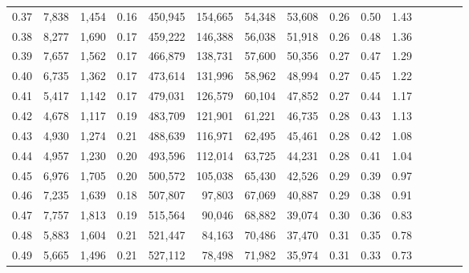 \begin{tabular}{rrrcrrrrrrrrrrr}
0.37 &   7,838 &  1,454 &                                       0.16 &  450,945 &  154,665 &   54,348 &   53,608 &  0.26 &  0.50 &                         1.43 \\
0.38 &   8,277 &  1,690 &                                       0.17 &  459,222 &  146,388 &   56,038 &   51,918 &  0.26 &  0.48 &                         1.36 \\
0.39 &   7,657 &  1,562 &                                       0.17 &  466,879 &  138,731 &   57,600 &   50,356 &  0.27 &  0.47 &                         1.29 \\
0.40 &   6,735 &  1,362 &                                       0.17 &  473,614 &  131,996 &   58,962 &   48,994 &  0.27 &  0.45 &                         1.22 \\
0.41 &   5,417 &  1,142 &                                       0.17 &  479,031 &  126,579 &   60,104 &   47,852 &  0.27 &  0.44 &                         1.17 \\
0.42 &   4,678 &  1,117 &                                       0.19 &  483,709 &  121,901 &   61,221 &   46,735 &  0.28 &  0.43 &                         1.13 \\
0.43 &   4,930 &  1,274 &                                       0.21 &  488,639 &  116,971 &   62,495 &   45,461 &  0.28 &  0.42 &                         1.08 \\
0.44 &   4,957 &  1,230 &                                       0.20 &  493,596 &  112,014 &   63,725 &   44,231 &  0.28 &  0.41 &                         1.04 \\
0.45 &   6,976 &  1,705 &                                       0.20 &  500,572 &  105,038 &   65,430 &   42,526 &  0.29 &  0.39 &                         0.97 \\
0.46 &   7,235 &  1,639 &                                       0.18 &  507,807 &   97,803 &   67,069 &   40,887 &  0.29 &  0.38 &                         0.91 \\
0.47 &   7,757 &  1,813 &                                       0.19 &  515,564 &   90,046 &   68,882 &   39,074 &  0.30 &  0.36 &                         0.83 \\
0.48 &   5,883 &  1,604 &                                       0.21 &  521,447 &   84,163 &   70,486 &   37,470 &  0.31 &  0.35 &                         0.78 \\
0.49 &   5,665 &  1,496 &                                       0.21 &  527,112 &   78,498 &   71,982 &   35,974 &  0.31 &  0.33 &                         0.73 \\

\end{tabular}
